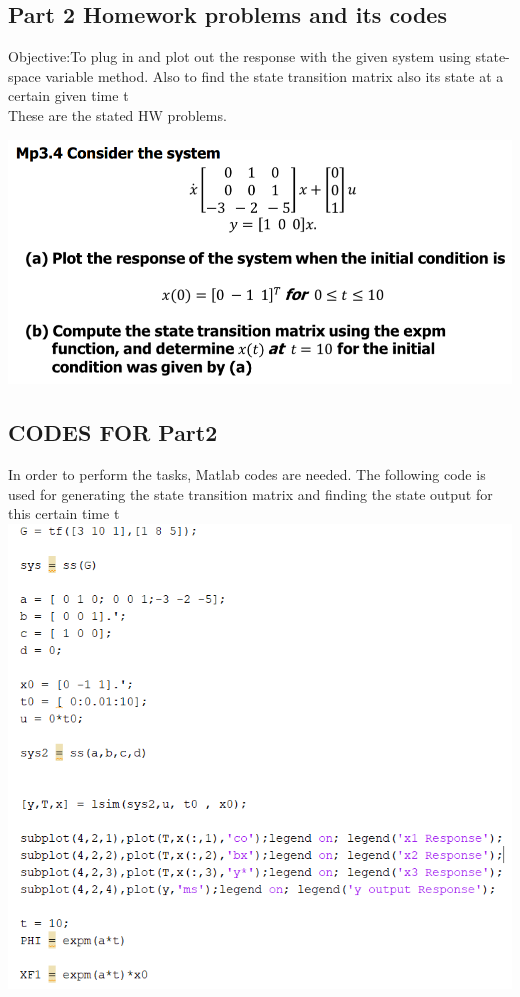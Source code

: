 \documentclass[12pt]{article}
\begin{document}
\cleardoublepage




\cleardoublepage
\subsection{Part 2 Homework problems and its codes}
Objective:To plug in and plot out the response with the given system using state-space variable method. Also to find the state transition matrix also its state at a certain given time t\\
These are the stated HW problems.

\includegraphics[scale=0.5]{HW2_problem.png} \\


\subsection{CODES FOR Part2}
In order to perform the tasks, Matlab codes are needed. The following code is used for generating the state transition matrix and finding the state output for this certain time t \\

\includegraphics[scale=0.5]{HW2_code.png}
\cleardoublepage
\end{document}
